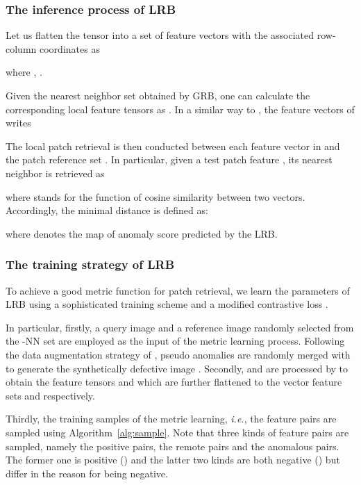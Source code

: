 \documentclass[lettersize,journal]{IEEEtran}
\begin{document}
\subsubsection{The inference process of LRB}
Let us flatten the tensor  into a set of feature vectors with
the associated row-column coordinates as

where , .

Given the nearest neighbor set  obtained by GRB, one can calculate the
corresponding local feature tensors as . In a similar way to , the feature vectors of
 writes

The local patch retrieval is then conducted between each feature vector in
 and the patch reference set . In
particular, given a test patch feature , its nearest neighbor
is retrieved as

where  stands for the function of cosine similarity between two
vectors. Accordingly, the minimal distance is defined as:

where  denotes the map of anomaly
score predicted by the LRB.

\subsubsection{The training strategy of LRB}
\label{subsubsec:lrb_train}
To achieve a good metric function  for patch retrieval, we learn the
parameters of LRB using a sophisticated training scheme and a modified contrastive loss
\cite{1640964}.

In particular, firstly, a query image  and a reference
image  randomly selected from the -NN set 
are employed as the input of the metric learning process. Following the data
augmentation strategy of \cite{yang2023memseg}, pseudo anomalies are randomly
merged with  to generate the synthetically defective image
.
Secondly,  and  are processed by
 to obtain the feature tensors  and
 which are further flattened to the vector feature sets
 and  respectively.

Thirdly, the training samples of the metric learning, \emph{i.e.}, the feature pairs are
sampled using Algorithm~\ref{alg:sample}. Note that three kinds of feature pairs are
sampled, namely the positive pairs, the remote pairs and the anomalous pairs. The former
one is positive () and the latter two kinds are both negative () but
differ in the reason for being negative.
\end{document}
